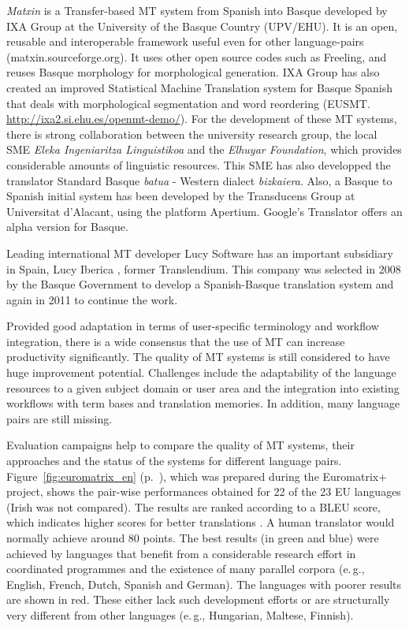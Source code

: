 \begin{multicols}{2}
\textit{Matxin} is a Transfer-based MT system from Spanish into Basque developed by IXA Group at the University of the Basque Country (UPV/EHU). It is an open, reusable and interoperable framework useful even for other language-pairs (matxin.sourceforge.org). It uses other open source codes such as Freeling, and reuses Basque morphology for morphological generation. IXA Group has also created an improved Statistical Machine Translation system for Basque Spanish that deals with morphological segmentation and word reordering (EUSMT. \url{http://ixa2.si.ehu.es/openmt-demo/}).  For the development of these MT systems, there is strong collaboration between the university research group, the local SME \textit{Eleka Ingeniaritza Linguistikoa} and the \textit{Elhuyar Foundation}, which provides considerable amounts of linguistic resources. This SME has also developped the translator Standard Basque \textit{batua} - Western dialect \textit{bizkaiera}. Also, a Basque to Spanish initial system has been developed by the Transducens Group at Universitat d’Alacant, using the platform Apertium.  Google's Translator offers an alpha version for Basque.

Leading international MT developer Lucy Software has an important subsidiary in Spain, Lucy Iberica \cite{BAS-Nota35}, former Trans\-len\-dium. This company was selected in 2008 by the Basque Government to develop a Spanish-Basque translation system and again in 2011 to continue the work. 

Provided good adaptation in terms of user-specific terminology and workflow integration, there is a wide consensus that the use of MT can increase productivity significantly. The quality of MT systems is still considered to have huge improvement potential. Challenges include the adaptability of the language resources to a given subject domain or user area and the integration into existing workflows with term bases and translation memories. In addition, many language pairs are still missing.

Evaluation campaigns help to compare the quality of MT systems, their approaches and the status of the systems for different language pairs. Figure~\ref{fig:euromatrix_en} (p.~\pageref{fig:euromatrix_en}), which was prepared during the Euromatrix+ project, shows the pair-wise performances obtained for 22 of the 23 EU languages (Irish was not compared). The results are ranked according to a BLEU score, which indicates higher scores for better translations \cite{bleu1}. A human translator would normally achieve around 80 points. The best results (in green and blue) were achieved by languages that benefit from a considerable research effort in coordinated programmes and the existence of many parallel corpora (e.\,g., English, French, Dutch, Spanish and German). The languages with poorer results are shown in red. These either lack such development efforts or are structurally very different from other languages (e.\,g., Hungarian, Maltese, Finnish).


\end{multicols}
